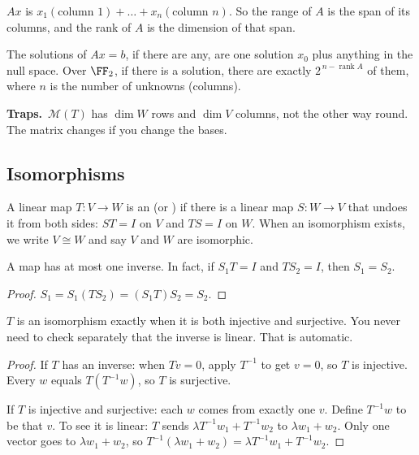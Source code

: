 \documentclass[11pt]{scrartcl}
\newcommand{\MM}{\mathcal M}
\newcommand{\traps}{\par\medskip\noindent\textbf{\color{RawSienna}Traps.}\ }
\begin{document}
\begin{proposition*}
  $Ax$ is $x_1(\text{column }1)+\dots+x_n(\text{column }n)$.
  So the range of $A$ is the span of its columns, and the rank of $A$ is the dimension of that span.

  The solutions of $Ax=b$, if there are any, are one solution $x_0$ plus anything in the null space.
  Over $\FF_2$, if there is a solution, there are exactly $2^{\,n-\operatorname{rank}A}$ of them, where $n$ is the number of unknowns (columns).
\end{proposition*}

\traps $\MM(T)$ has $\dim W$ rows and $\dim V$ columns, not the other way round.
The matrix changes if you change the bases.

\subsection{Isomorphisms}
\begin{definition*}
  A linear map $T\colon V\to W$ is an  (or ) if there is a linear map $S\colon W\to V$ that undoes it from both sides: $ST=I$ on $V$ and $TS=I$ on $W$.
  When an isomorphism exists, we write $V\cong W$ and say $V$ and $W$ are isomorphic.
\end{definition*}

\begin{proposition*}[LADR 3.60]
  A map has at most one inverse.
  In fact, if $S_1T=I$ and $TS_2=I$, then $S_1=S_2$.
\end{proposition*}
\begin{proof}
  $S_1=S_1(TS_2)=(S_1T)S_2=S_2$.
\end{proof}

\begin{theorem*}[LADR 3.63]
  $T$ is an isomorphism exactly when it is both injective and surjective.
  You never need to check separately that the inverse is linear. That is automatic.
\end{theorem*}
\begin{proof}
  If $T$ has an inverse: when $Tv=0$, apply $T^{-1}$ to get $v=0$, so $T$ is injective. Every $w$ equals $T(T^{-1}w)$, so $T$ is surjective.

  If $T$ is injective and surjective: each $w$ comes from exactly one $v$. Define $T^{-1}w$ to be that $v$.
  To see it is linear: $T$ sends $\lambda T^{-1}w_1+T^{-1}w_2$ to $\lambda w_1+w_2$. Only one vector goes to $\lambda w_1+w_2$, so $T^{-1}(\lambda w_1+w_2)=\lambda T^{-1}w_1+T^{-1}w_2$.
\end{proof}
\end{document}
